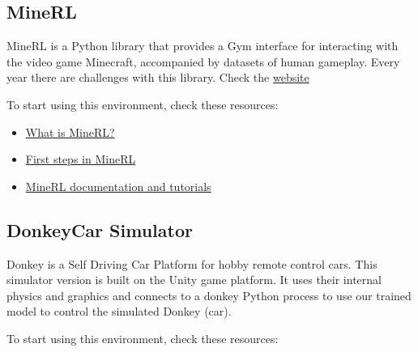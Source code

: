 \documentclass[11pt,a4paper]{article}
\begin{document}
\subsection{MineRL}\label{minerl}


MineRL is a Python library that provides a Gym interface for interacting with the video game Minecraft, accompanied by datasets of human gameplay. Every year there are challenges with this library. Check the \href{https://minerl.io/}{website}

To start using this environment, check these resources:

\begin{itemize}
\item
  \href{https://www.youtube.com/watch?v=z6PTrGifupU}{What is MineRL?}
\item
  \href{https://www.youtube.com/watch?v=8yIrWcyWGek}{First steps in MineRL}
\item
  \href{https://minerl.readthedocs.io/en/latest/}{MineRL documentation and tutorials}
\end{itemize}

\subsection{DonkeyCar Simulator}\label{donkeycar-simulator}


Donkey is a Self Driving Car Platform for hobby remote control cars. This simulator version is built on the Unity game platform. It uses their internal physics and graphics and connects to a donkey Python process to use our trained model to control the simulated Donkey (car).

To start using this environment, check these resources:
\end{document}
